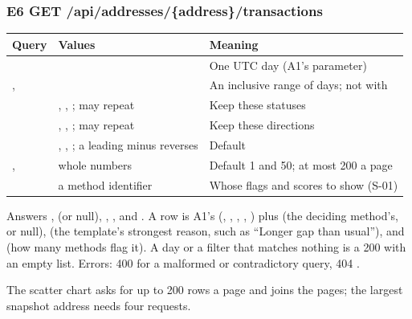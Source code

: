 \subsubsection*{E6 \quad GET /api/addresses/\{address\}/transactions}
\begin{center}
\small
\begin{tabularx}{\textwidth}{@{}L{2.4cm}L{4.3cm}Y@{}}
\toprule
\textbf{Query} & \textbf{Values} & \textbf{Meaning} \\
\midrule
{} &  & One UTC day (A1's parameter) \\
,  &  & An inclusive range of days; not with  \\
 & , , ; may repeat & Keep these statuses \\
 & , , ; may repeat & Keep these directions \\
 & , , ; a leading minus reverses & Default  \\
,  & whole numbers & Default 1 and 50; at most 200 a page \\
 & a method identifier & Whose flags and scores to show (S-01) \\
\bottomrule
\end{tabularx}
\end{center}
Answers ,  (or null), , , 
and . A row is A1's  (, , ,
, ) plus  (the deciding method's, or null),
 (the template's strongest reason, such as ``Longer gap than usual''),
 and  (how many methods flag it). A day or a filter that matches
nothing is a 200 with an empty list. Errors: 400 for a malformed or contradictory query, 404
.

The scatter chart asks for up to 200 rows a page and joins the pages; the largest snapshot address
needs four requests.

